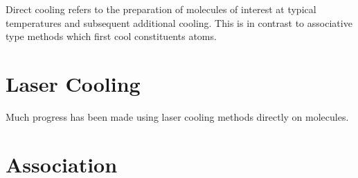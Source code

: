 Direct cooling refers to the preparation of molecules of interest at typical temperatures and subsequent additional cooling. This is in contrast to associative type methods which first cool constituents atoms.

\section{Laser Cooling}

Much progress has been made using laser cooling methods directly on molecules.

\section{Association}

%


